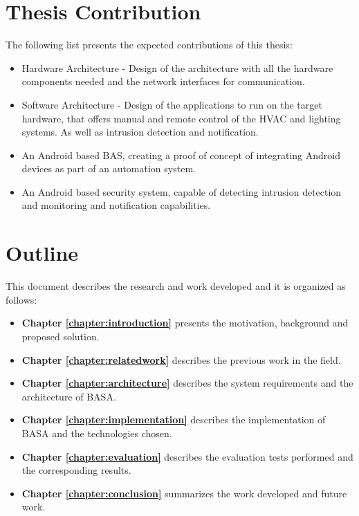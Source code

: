 




\section{Thesis Contribution}
\label{section:contribution}

The following list presents the expected contributions of this thesis:

\begin{itemize}
    \item Hardware Architecture - Design of the architecture with all the hardware components needed and the network interfaces for communication.
    \item Software Architecture - Design of the applications to run on the target hardware, that offers manual and remote control of the \ac{HVAC} and lighting systems. As well as intrusion detection and notification.
    \item An Android based BAS, creating a proof of concept of integrating Android devices as part of an automation system.
    \item An Android based security system, capable of detecting intrusion detection and monitoring and notification capabilities.
    
\end{itemize}

\section{Outline}
This document describes the research and work developed and it is organized as follows:

\begin{itemize}
\item \textbf{Chapter \ref{chapter:introduction}} presents the motivation, background and proposed solution.
\item \textbf{Chapter \ref{chapter:relatedwork}} describes the previous work in the field.
\item \textbf{Chapter \ref{chapter:architecture}} describes the system requirements and the architecture of BASA.
\item \textbf{Chapter \ref{chapter:implementation}} describes the implementation of BASA and the technologies chosen.
\item \textbf{Chapter \ref{chapter:evaluation}} describes the evaluation tests performed and the corresponding results.
\item \textbf{Chapter \ref{chapter:conclusion}} summarizes the work developed and future work.
\end{itemize}

\cleardoublepage
